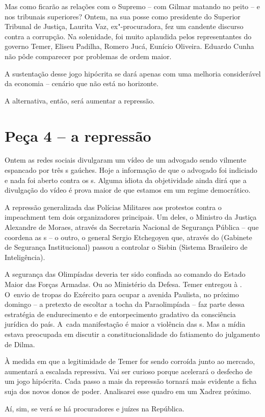 Mas como ficarão as relações com o Supremo -- com Gilmar matando no
peito -- e nos tribunais superiores? Ontem, na sua posse como presidente
do Superior Tribunal de Justiça, Laurita Vaz, ex"-procuradora, fez um
candente discurso contra a corrupção. Na solenidade, foi muito aplaudida
pelos representantes do governo Temer, Eliseu Padilha, Romero Jucá,
Eunício Oliveira. Eduardo Cunha não pôde comparecer por problemas de
ordem maior.

A sustentação desse jogo hipócrita se dará apenas com uma melhoria
considerável da economia -- cenário que não está no horizonte.

A alternativa, então, será aumentar a repressão.

\section{Peça 4 -- a repressão}

Ontem as redes sociais divulgaram um vídeo de um advogado sendo vilmente
espancado por três s gaúches. Hoje a informação de que o advogado foi
indiciado e nada foi aberto contra os s. Alguma idiota da objetividade
ainda dirá que a divulgação do vídeo é prova maior de que estamos em um
regime democrático.

A repressão generalizada das Polícias Militares aos protestos contra o
impeachment tem dois organizadores principais. Um deles, o Ministro da
Justiça Alexandre de Moraes, através da Secretaria Nacional de Segurança
Pública -- que coordena as s -- o outro, o general Sergio Etchegoyen
que, através do  (Gabinete de Segurança Institucional) passou a
controlar o Sisbin (Sistema Brasileiro de Inteligência).

A segurança das Olimpíadas deveria ter sido confiada ao comando do
Estado Maior das Forças Armadas. Ou ao Ministério da Defesa. Temer
entregou à . O~envio de tropas do Exército para ocupar a avenida
Paulista, no próximo domingo -- a pretexto de escoltar a tocha da
Paraolimpíada -- faz parte dessa estratégia de endurecimento e de
entorpecimento gradativo da consciência jurídica do país. A~cada
manifestação é maior a violência das s. Mas a mídia estava preocupada
em discutir a constitucionalidade do fatiamento do julgamento de Dilma.

À medida em que a legitimidade de Temer for sendo corroída junto ao
mercado, aumentará a escalada repressiva. Vai ser curioso porque
acelerará o desfecho de um jogo hipócrita. Cada passo a mais da
repressão tornará mais evidente a ficha suja dos novos donos de poder.
Analisarei esse quadro em um Xadrez próximo.

Aí, sim, se verá se há procuradores e juízes na República.
